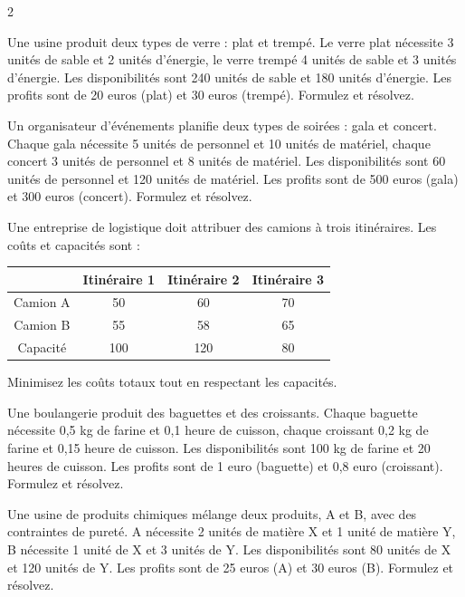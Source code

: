 \begin{multicols}{2}
\begin{exercice}
	Une usine produit deux types de verre : plat et trempé. Le verre plat nécessite 3 unités de sable et 2 unités d'énergie, le verre trempé 4 unités de sable et 3 unités d'énergie. Les disponibilités sont 240 unités de sable et 180 unités d'énergie. Les profits sont de 20 euros (plat) et 30 euros (trempé). Formulez et résolvez.
\end{exercice}

\begin{exercice}
	Un organisateur d'événements planifie deux types de soirées : gala et concert. Chaque gala nécessite 5 unités de personnel et 10 unités de matériel, chaque concert 3 unités de personnel et 8 unités de matériel. Les disponibilités sont 60 unités de personnel et 120 unités de matériel. Les profits sont de 500 euros (gala) et 300 euros (concert). Formulez et résolvez.
\end{exercice}

\begin{exercice}
	Une entreprise de logistique doit attribuer des camions à trois itinéraires. Les coûts et capacités sont :
	\begin{center}
		\begin{tabular}{c|ccc}
			& Itinéraire 1 & Itinéraire 2 & Itinéraire 3 \\
			\hline
			Camion A & 50 & 60 & 70 \\
			Camion B & 55 & 58 & 65 \\
			Capacité & 100 & 120 & 80 \\
		\end{tabular}
	\end{center}
	Minimisez les coûts totaux tout en respectant les capacités.
\end{exercice}

\begin{exercice}
	Une boulangerie produit des baguettes et des croissants. Chaque baguette nécessite 0,5 kg de farine et 0,1 heure de cuisson, chaque croissant 0,2 kg de farine et 0,15 heure de cuisson. Les disponibilités sont 100 kg de farine et 20 heures de cuisson. Les profits sont de 1 euro (baguette) et 0,8 euro (croissant). Formulez et résolvez.
\end{exercice}

\begin{exercice}
	Une usine de produits chimiques mélange deux produits, A et B, avec des contraintes de pureté. A nécessite 2 unités de matière X et 1 unité de matière Y, B nécessite 1 unité de X et 3 unités de Y. Les disponibilités sont 80 unités de X et 120 unités de Y. Les profits sont de 25 euros (A) et 30 euros (B). Formulez et résolvez.
\end{exercice}


\end{multicols}
